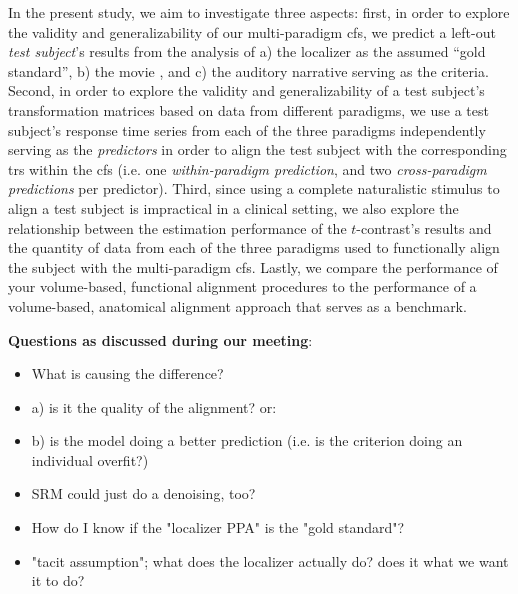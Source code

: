 In the present study, we aim to investigate three aspects:
first, in order to explore the validity and generalizability of our
multi-paradigm \ac{cfs}, we predict a left-out \textit{test subject}'s results
from the analysis of
%
a) the localizer \citep{sengupta2016extension} as the assumed ``gold standard'',
%
b) the movie \citep{haeusler2022processing}, and
%
c) the auditory narrative \citep{haeusler2022processing}
%
serving as the criteria.
Second, in order to explore the validity and generalizability of a test
subject's transformation matrices based on data from different paradigms, we use
a test subject's response time series from each of the three paradigms
independently serving as the \textit{predictors} in order to align the test
subject with the corresponding \acp{tr} within the \ac{cfs} (i.e. one
\textit{within-paradigm prediction}, and two \textit{cross-paradigm predictions}
per predictor).
Third, since using a complete naturalistic stimulus to align a test subject is
impractical in a clinical setting, we also explore the relationship between the
estimation performance of the $t$-contrast's results and the quantity of data
from each of the three paradigms used to functionally align the subject with the
multi-paradigm \ac{cfs}.
Lastly, we compare the performance of your volume-based, functional alignment
procedures to the performance of a volume-based, anatomical alignment approach
that serves as a benchmark.



\textbf{Questions as discussed during our meeting}:
\begin{itemize}

\item What is causing the difference?

\item a) is it the quality of the alignment? or:

\item b) is the model doing a better prediction
    (i.e. is the criterion doing an individual overfit?)

\item SRM could just do a denoising, too?

\item How do I know if the "localizer PPA" is the "gold standard"?

\item "tacit assumption"; what does the localizer actually do?
    does it what we want it to do?

\end{itemize}


